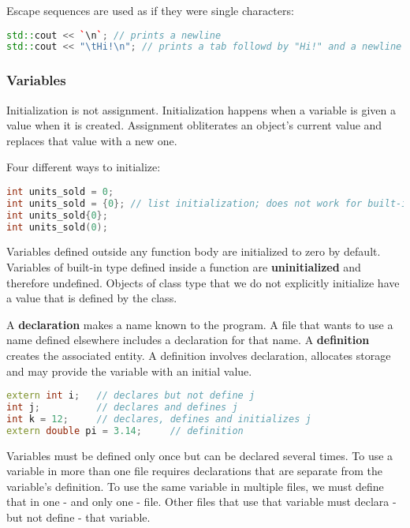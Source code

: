 
Escape sequences are used as if they were single characters:
\begin{lstlisting}[language=c++]
std::cout << `\n`; // prints a newline 
std::cout << "\tHi!\n"; // prints a tab followd by "Hi!" and a newline
\end{lstlisting}

\subsubsection*{Variables}

Initialization is not assignment. Initialization happens when a variable is given a value when it is created. Assignment obliterates an object's current value and replaces that value with a new one. 

Four different ways to initialize:
\begin{lstlisting}[language=c++]
int units_sold = 0; 
int units_sold = {0}; // list initialization; does not work for built-in types if data loss is likely
int units_sold{0}; 
int units_sold(0);
\end{lstlisting}

Variables defined outside any function body are initialized to zero by default.  Variables of built-in type defined inside a function are \textbf{uninitialized} and therefore undefined. Objects of class type that we do not explicitly initialize have a value that is defined by the class.

A \textbf{declaration} makes a name known to the program. A file that wants to use a name defined elsewhere includes a declaration for that name. A \textbf{definition} creates the associated entity. A definition involves declaration, allocates storage and may provide the variable with an initial value. 
\begin{lstlisting}[language=c++]
extern int i;   // declares but not define j
int j;          // declares and defines j
int k = 12;     // declares, defines and initializes j
extern double pi = 3.14;     // definition
\end{lstlisting}

Variables must be defined only once but can be declared several times. To use a variable in more than one file requires declarations that are separate from the variable's definition. To use the same variable in multiple files, we must define that in one - and only one - file. Other files that use that variable must declara - but not define - that variable.